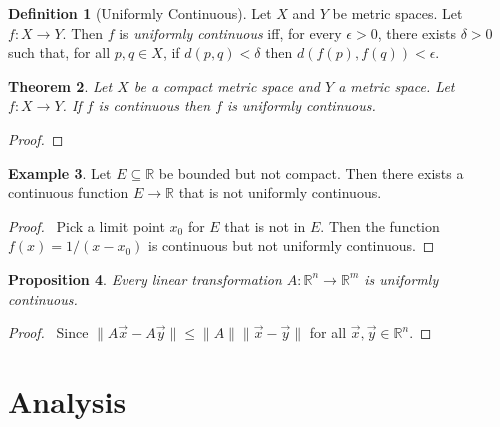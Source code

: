 \documentclass{book}
\let\qed\relax
\newtheorem{prop}{Proposition}[chapter]
\newtheorem{thm}[prop]{Theorem}
\theoremstyle{definition}
\newtheorem{df}[prop]{Definition}
\newtheorem{ex}[prop]{Example}
\begin{document}
\begin{df}[Uniformly Continuous]
Let $X$ and $Y$ be metric spaces. Let $f : X \rightarrow Y$. Then $f$ is \emph{uniformly continuous} iff, for every $\epsilon > 0$, there exists $\delta > 0$ such that, for all $p,q \in X$, if $d(p,q) < \delta$ then $d(f(p),f(q)) < \epsilon$.
\end{df}

\begin{thm}
Let $X$ be a compact metric space and $Y$ a metric space. Let $f : X \rightarrow Y$. If $f$ is continuous then $f$ is uniformly continuous.
\end{thm}

\begin{proof}
\pf
{}
\qed
\end{proof}

\begin{ex}
Let $E \subseteq \mathbb{R}$ be bounded but not compact. Then there exists a continuous function $E \rightarrow \mathbb{R}$ that is not uniformly continuous.
\end{ex}

\begin{proof}
\pf\ Pick a limit point $x_0$ for $E$ that is not in $E$. Then the function $f(x) = 1/(x-x_0)$ is continuous but not uniformly continuous. \qed
\end{proof}

\begin{prop}
Every linear transformation $A : \mathbb{R}^n \rightarrow \mathbb{R}^m$ is uniformly continuous.
\end{prop}

\begin{proof}
\pf\ Since $\| A \vec{x} - A \vec{y} \| \leq \| A \| \| \vec{x} - \vec{y} \|$ for all $\vec{x}, \vec{y} \in \mathbb{R}^n$. \qed
\end{proof}

\part{Analysis}
\end{document}
